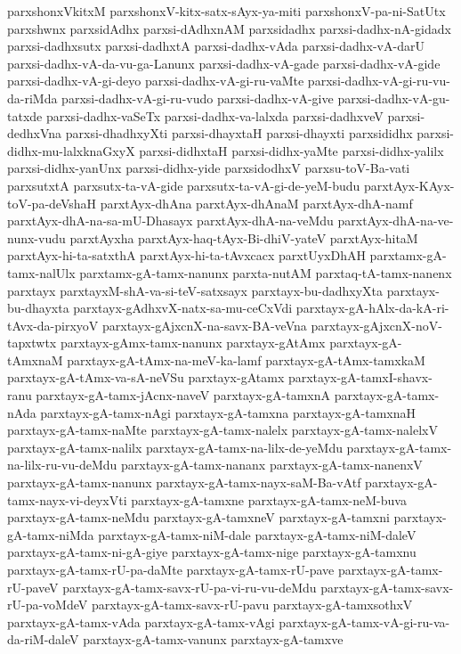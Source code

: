 {parxshonxVkitxM
parxshonxV-kitx-satx-sAyx-ya-miti
parxshonxV-pa-ni-SatUtx
parxshwnx
parxsidAdhx
parxsi-dAdhxnAM
parxsidadhx
parxsi-dadhx-nA-gidadx
parxsi-dadhxsutx
parxsi-dadhxtA
parxsi-dadhx-vAda
parxsi-dadhx-vA-darU
parxsi-dadhx-vA-da-vu-ga-Lanunx
parxsi-dadhx-vA-gade
parxsi-dadhx-vA-gide
parxsi-dadhx-vA-gi-deyo
parxsi-dadhx-vA-gi-ru-vaMte
parxsi-dadhx-vA-gi-ru-vu-da-riMda
parxsi-dadhx-vA-gi-ru-vudo
parxsi-dadhx-vA-give
parxsi-dadhx-vA-gu-tatxde
parxsi-dadhx-vaSeTx
parxsi-dadhx-va-lalxda
parxsi-dadhxveV
parxsi-dedhxVna
parxsi-dhadhxyXti
parxsi-dhayxtaH
parxsi-dhayxti
parxsididhx
parxsi-didhx-mu-lalxknaGxyX
parxsi-didhxtaH
parxsi-didhx-yaMte
parxsi-didhx-yalilx
parxsi-didhx-yanUnx
parxsi-didhx-yide
parxsidodhxV
parxsu-toV-Ba-vati
parxsutxtA
parxsutx-ta-vA-gide
parxsutx-ta-vA-gi-de-yeM-budu
parxtAyx-KAyx-toV-pa-deVshaH
parxtAyx-dhAna
parxtAyx-dhAnaM
parxtAyx-dhA-namf
parxtAyx-dhA-na-sa-mU-Dhasayx
parxtAyx-dhA-na-veMdu
parxtAyx-dhA-na-ve-nunx-vudu
parxtAyxha
parxtAyx-haq-tAyx-Bi-dhiV-yateV
parxtAyx-hitaM
parxtAyx-hi-ta-satxthA
parxtAyx-hi-ta-tAvxcacx
parxtUyxDhAH
parxtamx-gA-tamx-nalUlx
parxtamx-gA-tamx-nanunx
parxta-nutAM
parxtaq-tA-tamx-nanenx
parxtayx
parxtayxM-shA-va-si-teV-satxsayx
parxtayx-bu-dadhxyXta
parxtayx-bu-dhayxta
parxtayx-gAdhxvX-natx-sa-mu-ceCxVdi
parxtayx-gA-hAlx-da-kA-ri-tAvx-da-pirxyoV
parxtayx-gAjxcnX-na-savx-BA-veVna
parxtayx-gAjxcnX-noV-tapxtwtx
parxtayx-gAmx-tamx-nanunx
parxtayx-gAtAmx
parxtayx-gA-tAmxnaM
parxtayx-gA-tAmx-na-meV-ka-lamf
parxtayx-gA-tAmx-tamxkaM
parxtayx-gA-tAmx-va-sA-neVSu
parxtayx-gAtamx
parxtayx-gA-tamxI-shavx-ranu
parxtayx-gA-tamx-jAcnx-naveV
parxtayx-gA-tamxnA
parxtayx-gA-tamx-nAda
parxtayx-gA-tamx-nAgi
parxtayx-gA-tamxna
parxtayx-gA-tamxnaH
parxtayx-gA-tamx-naMte
parxtayx-gA-tamx-nalelx
parxtayx-gA-tamx-nalelxV
parxtayx-gA-tamx-nalilx
parxtayx-gA-tamx-na-lilx-de-yeMdu
parxtayx-gA-tamx-na-lilx-ru-vu-deMdu
parxtayx-gA-tamx-nananx
parxtayx-gA-tamx-nanenxV
parxtayx-gA-tamx-nanunx
parxtayx-gA-tamx-nayx-saM-Ba-vAtf
parxtayx-gA-tamx-nayx-vi-deyxVti
parxtayx-gA-tamxne
parxtayx-gA-tamx-neM-buva
parxtayx-gA-tamx-neMdu
parxtayx-gA-tamxneV
parxtayx-gA-tamxni
parxtayx-gA-tamx-niMda
parxtayx-gA-tamx-niM-dale
parxtayx-gA-tamx-niM-daleV
parxtayx-gA-tamx-ni-gA-giye
parxtayx-gA-tamx-nige
parxtayx-gA-tamxnu
parxtayx-gA-tamx-rU-pa-daMte
parxtayx-gA-tamx-rU-pave
parxtayx-gA-tamx-rU-paveV
parxtayx-gA-tamx-savx-rU-pa-vi-ru-vu-deMdu
parxtayx-gA-tamx-savx-rU-pa-voMdeV
parxtayx-gA-tamx-savx-rU-pavu
parxtayx-gA-tamxsothxV
parxtayx-gA-tamx-vAda
parxtayx-gA-tamx-vAgi
parxtayx-gA-tamx-vA-gi-ru-va-da-riM-daleV
parxtayx-gA-tamx-vanunx
parxtayx-gA-tamxve
}
